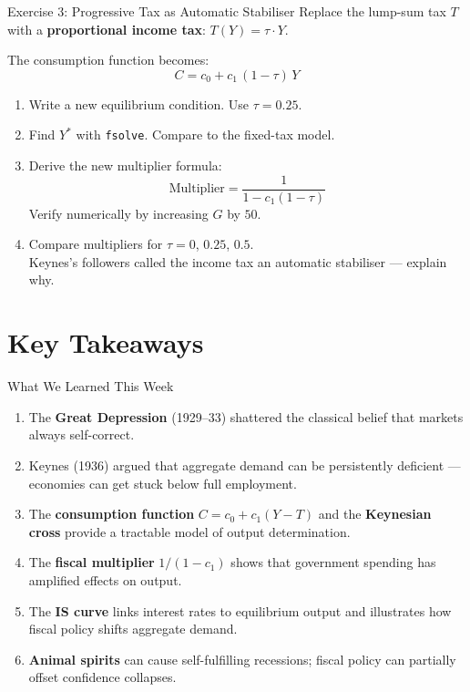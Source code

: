 \documentclass[aspectratio=169, 10pt]{beamer}
\begin{document}
\begin{frame}{Exercise 3: Progressive Tax as Automatic Stabiliser}
Replace the lump-sum tax $T$ with a \textbf{proportional income tax}:
$T(Y) = \tau \cdot Y$.
\vspace{0.3em}

The consumption function becomes:
\[
  C = c_0 + c_1\,(1 - \tau)\,Y
\]

\begin{enumerate}
  \item Write a new equilibrium condition. Use $\tau = 0.25$.
  \item Find $Y^*$ with \texttt{fsolve}. Compare to the fixed-tax model.
  \item Derive the new multiplier formula:
  \[
    \text{Multiplier} = \frac{1}{1 - c_1(1 - \tau)}
  \]
  Verify numerically by increasing $G$ by $50$.
  \item Compare multipliers for $\tau = 0$, $0.25$, $0.5$.\\
        Keynes's followers called the income tax an \alert{automatic stabiliser} ---
        explain why.
\end{enumerate}
\end{frame}

\section{Key Takeaways}

\begin{frame}{What We Learned This Week}
\begin{enumerate}
  \item The \textbf{Great Depression} (1929--33) shattered the classical belief
        that markets always self-correct.
  \item Keynes (1936) argued that \alert{aggregate demand} can be persistently
        deficient --- economies can get stuck below full employment.
  \item The \textbf{consumption function} $C = c_0 + c_1(Y-T)$ and the
        \textbf{Keynesian cross} provide a tractable model of output
        determination.
  \item The \textbf{fiscal multiplier} $1/(1-c_1)$ shows that government
        spending has amplified effects on output.
  \item The \textbf{IS curve} links interest rates to equilibrium output
        and illustrates how fiscal policy shifts aggregate demand.
  \item \textbf{Animal spirits} can cause self-fulfilling recessions;
        fiscal policy can partially offset confidence collapses.
\end{enumerate}
\end{frame}
\end{document}
